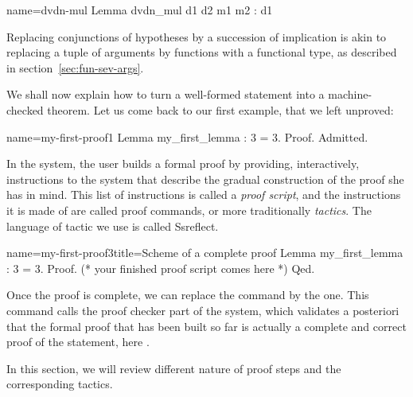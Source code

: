 \begin{coq}{name=dvdn-mul}{}
Lemma dvdn_mul d1 d2 m1 m2 : d1 %
\end{coq}
Replacing conjunctions of hypotheses by a succession of implication is
akin to replacing a tuple of arguments by functions with a functional
type, as described in section~\ref{sec:fun-sev-args}.



We shall now explain how to turn a well-formed statement into a
machine-checked theorem. Let us come back to our first example, that
we left unproved:
\begin{coq}{name=my-first-proof1}{}
Lemma my_first_lemma : 3 = 3.
Proof.
Admitted.
\end{coq}
In the \Coq{} system, the user builds a formal proof by providing,
interactively, instructions to the \Coq{}
system that describe the gradual construction of the proof she has in
mind. This list of instructions is called a \emph{proof script}, and
the instructions it is made of are called proof commands, or more traditionally
\emph{tactics}.  The language of tactic we use is called
Ssreflect.

\begin{coq}{name=my-first-proof3}{title=Scheme of a complete proof}
Lemma my_first_lemma : 3 = 3.
Proof.
(* your finished proof script comes here *)
Qed.
\end{coq}

Once the proof is complete, we can replace the  command by
the  one. This command calls the proof checker part of  the \Coq{}
system, which validates a posteriori that the formal proof that has
been built so far is actually a complete and correct proof of the
statement, here .

In this section, we will review different nature of proof steps and
the corresponding tactics.

